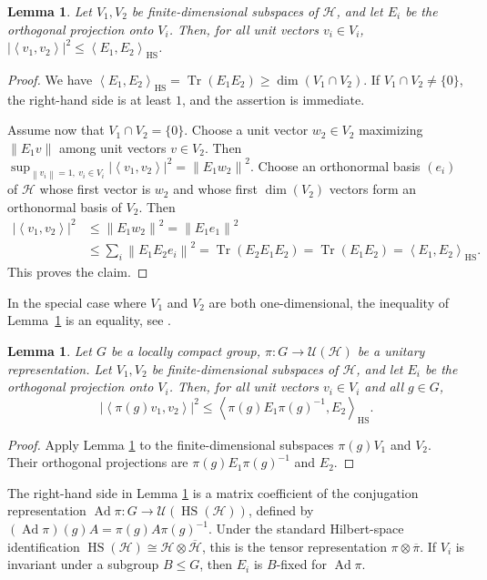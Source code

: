 \documentclass[12pt,a4paper]{amsproc}
\newtheorem{lemma}[theorem]{Lemma}
\theoremstyle{definition}
\DeclareMathOperator{\HS}{HS}
\DeclareMathOperator{\Tr}{Tr}
\DeclareMathOperator{\Ad}{Ad}
\newcommand{\cH}{\mathcal H}
\newcommand{\cU}{\mathcal U}
\newcommand{\ol}[1]{\overline{#1}}
\newcommand{\norm}[1]{\left\lVert #1\right\rVert}
\newcommand{\abs}[1]{\left\lvert #1\right\rvert}
\newcommand{\ip}[2]{\left\langle #1,#2\right\rangle}
\begin{document}
\begin{lemma}\label{lem:HS-projections}
Let $V_1,V_2$ be finite-dimensional subspaces of $\cH$, and let $E_i$ be the orthogonal projection onto $V_i$. Then, for all unit vectors $v_i\in V_i$, $\abs{\ip{v_1}{v_2}}^2\leq \ip{E_1}{E_2}_{\HS}$.
\end{lemma}

\begin{proof}
We have $\ip{E_1}{E_2}_{\HS}=\Tr(E_1E_2)\geq \dim(V_1\cap V_2)$. If $V_1\cap V_2\neq\{0\}$, the right-hand side is at least $1$, and the assertion is immediate.

Assume now that $V_1\cap V_2=\{0\}$. Choose a unit vector $w_2\in V_2$ maximizing $\norm{E_1v}$ among unit vectors $v\in V_2$.   
Then $\sup_{\norm{v_i}=1,\ v_i\in V_i}\abs{\ip{v_1}{v_2}}^2=\norm{E_1w_2}^2$. Choose an orthonormal basis $(e_i)$ of $\cH$ whose first vector is $w_2$ and whose first $\dim(V_2)$ vectors form an orthonormal basis of $V_2$. Then
\begin{align*}
        \abs{\ip{v_1}{v_2}}^2
        &\leq \norm{E_1w_2}^2
         = \norm{E_1e_1}^2                                      \\
        &\leq \sum_i \norm{E_1E_2e_i}^2
         = \Tr(E_2E_1E_2)
         = \Tr(E_1E_2)
         = \ip{E_1}{E_2}_{\HS}.
\end{align*}
This proves the claim.
\end{proof}

In the special case where $V_1$ and $V_2$ are both one-dimensional, the inequality of Lemma~\ref{lem:HS-projections} is an equality, see  \cite[Lemma~10.1]{EJK}. 

\begin{lemma}\label{lem:B-finite-bound}
Let $G$ be a   locally compact group,  $\pi \colon G\to\cU(\cH)$ be a unitary representation. Let $V_1,V_2$ be finite-dimensional subspaces of $\cH$, and let $E_i$ be the orthogonal projection onto $V_i$. Then, for all unit vectors $v_i\in V_i$ and all $g\in G$,
\[
        \abs{\ip{\pi(g)v_1}{v_2}}^2
        \leq
        \ip{\pi(g)E_1\pi(g)^{-1}}{E_2}_{\HS}.
\]
\end{lemma}

\begin{proof}
Apply Lemma \ref{lem:HS-projections} to the finite-dimensional subspaces $\pi(g)V_1$ and $V_2$. Their orthogonal projections are $\pi(g)E_1\pi(g)^{-1}$ and $E_2$.
\end{proof}

The right-hand side in Lemma \ref{lem:B-finite-bound} is a matrix coefficient of the conjugation representation $\Ad\pi \colon G\to\cU(\HS(\cH))$, defined by $(\Ad\pi)(g)A=\pi(g)A\pi(g)^{-1}$. Under the standard Hilbert-space identification $\HS(\cH)\cong\cH\otimes\ol\cH$, this is the tensor representation $\pi\otimes\ol\pi$. If $V_i$ is  invariant under a subgroup $B \leq G$, then $E_i$ is $B$-fixed for $\Ad\pi$.
\end{document}
